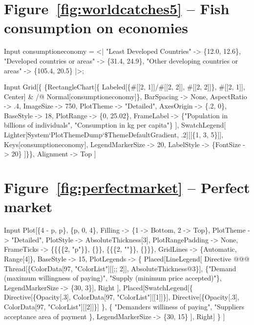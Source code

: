 \documentclass[11pt,fleqn]{book} %
\begin{document}
\section*{Figure~\ref{fig:worldcatches5} -- Fish consumption on economies }
\small{
\begin{mmaCell}[index=1]{Input}
  consumptioneconomy = <|
    "Least Developed Countries"           -> \{12.0, 12.6\}, 
    "Developed countries or areas"        -> \{31.4, 24.9\}, 
    "Other developing countries or areas" -> \{105.4, 20.5\}
  |>; 
\end{mmaCell}

\begin{mmaCell}{Input}
  Grid[\{
    \{RectangleChart[\{
      Labeled[\{#[[2, 1]]/#[[2, 2]], #[[2, 2]]\}, #[[2, 1]], Center] & /@ 
        Normal[consumptioneconomy]\}, 
      BarSpacing  -> None, 
      AspectRatio -> .4,
      ImageSize   -> 750, 
      PlotTheme   -> "Detailed", 
      AxesOrigin  -> \{.2, 0\},
      BaseStyle   -> 18, 
      PlotRange   -> \{0, 25.02\},
      FrameLabel  -> \{"Population in billions of individuals", 
        "Consumption in kg per capita"\}
    ],
    SwatchLegend[
      Lighter[System`PlotThemeDump`\$ThemeDefaultGradient, .2][[\{1, 3, 5\}]], 
      Keys[consumptioneconomy], 
      LegendMarkerSize -> 20, 
      LabelStyle       -> \{FontSize -> 20\}
    ]\}\}, 
    Alignment -> Top
  ]
\end{mmaCell}
}

\section*{Figure~\ref{fig:perfectmarket} -- Perfect market }
\small{
\begin{mmaCell}[index=1]{Input}
   Plot[\{4 - p, p\}, \{p, 0, 4\},
     Filling -> \{1 -> Bottom, 2 -> Top\}, 
     PlotTheme        -> "Detailed", 
     PlotStyle        -> AbsoluteThickness[3], 
     PlotRangePadding -> None, 
     FrameTicks       -> \{\{\{\{2, "p"\}\}, \{\}\}, \{\{\{2, ""\}\}, \{\}\}\}, 
     GridLines        -> \{Automatic, Range[4]\}, 
     BaseStyle        -> 15,
     PlotLegends      -> \{
       Placed[LineLegend[
         Directive @@@ Thread[\{ColorData[97, "ColorList"][[;; 2]], 
         AbsoluteThickness@3\}],
         \{"Demand (maximum willingness of paying)", 
         "Supply (minimum price accepted)"\}, 
         LegendMarkerSize -> \{30, 3\}], Right
       ],
       Placed[SwatchLegend[\{
         Directive[\{Opacity[.3], ColorData[97, "ColorList"][[1]]\}],
         Directive[\{Opacity[.3], ColorData[97, "ColorList"][[2]]\}]
         \}, \{
         "Demanders williness of paying", 
         "Suppliers acceptance area of payment
         \},
         LegendMarkerSize -> \{30, 15\}
       ], Right]
       \}
   ]
\end{mmaCell}
}
\end{document}
